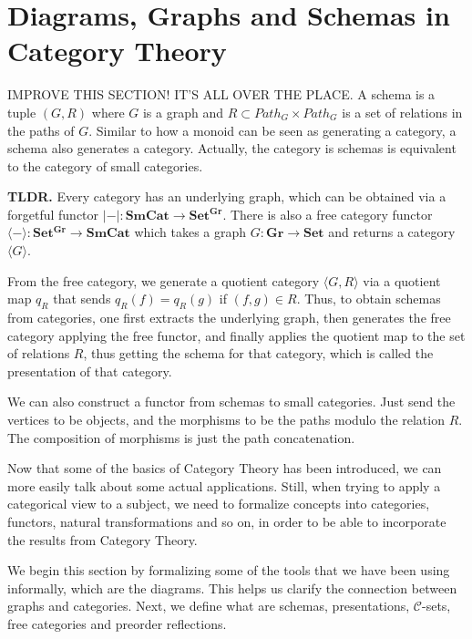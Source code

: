 \section{Diagrams, Graphs and Schemas in Category Theory}

IMPROVE THIS SECTION! IT'S ALL OVER THE PLACE.
A schema is a tuple $(G,R)$ where $G$ is a graph and
$R \subset Path_G \times Path_G$ is a set of relations in the paths of $G$.
Similar to how a monoid can be seen as generating a category, a schema
also generates a category. Actually, the category is schemas is equivalent
to the category of small categories.

\begin{shaded}
  \textbf{TLDR.}
  Every category has an underlying graph, which can be obtained via a forgetful functor
  $|-|:\mathbf{SmCat} \to \mathbf{Set^{\mathbf{Gr}}}$.
  There is also a free category functor $\langle-\rangle:\mathbf{Set^\mathbf{Gr}} \to \mathbf{SmCat}$
  which takes a graph $G:\mathbf{Gr}\to \mathbf{Set}$ and returns a category $\langle G \rangle$.

  From the free category, we generate a quotient category $\langle G, R \rangle$ via a quotient
  map $q_R$ that sends $q_R(f) = q_R(g)$ if $(f,g) \in R$.
  Thus, to obtain schemas from categories, one first extracts the underlying graph, then
  generates the free category applying the free functor, and finally applies the quotient map
  to the set of relations $R$, thus getting the schema for that category, which is called the
  presentation of that category.

  We can also construct a functor from schemas to small categories. Just send the vertices
  to be objects, and the morphisms to be the paths modulo the relation $R$. The composition
  of morphisms is just the path concatenation.
\end{shaded}



Now that some of the basics of Category Theory has been introduced, we can more
easily talk about some actual applications. Still, when trying to apply a categorical
view to a subject, we need to formalize concepts into categories, functors, natural
transformations and so on, in order to be able to incorporate the results from Category Theory.

We begin this section by formalizing some of the tools that we have been using informally,
which are the diagrams.
This helps us clarify the connection between graphs and categories.
Next, we define what are schemas, presentations, $\mathcal C$-sets, free categories
and preorder reflections.

